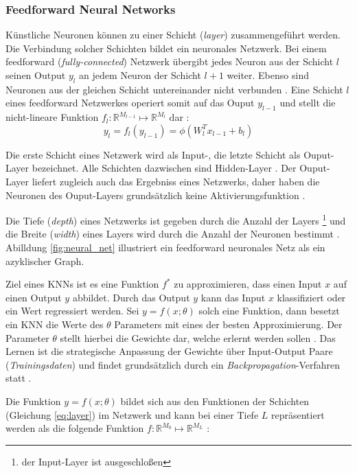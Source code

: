\subsubsection{Feedforward Neural Networks}
\label{sec:feedforwardNN}
Künstliche Neuronen können zu einer Schicht (\textit{layer}) zusammengeführt werden. Die Verbindung solcher Schichten bildet ein neuronales Netzwerk.
Bei einem feedforward (\textit{fully-connected}) Netzwerk übergibt jedes Neuron aus der Schicht $l$ seinen Output $y_{l}$ an jedem Neuron der Schicht $l+1$ weiter. Ebenso sind Neuronen aus der gleichen Schicht untereinander nicht verbunden \cite{Goodfellow-et-al-2016}.
Eine Schicht $l$ eines feedforward Netzwerkes operiert somit auf das Ouput $y_{l-1}$ und stellt die nicht-lineare Funktion $f_l :  \mathbb{R}^{M_{l-1}} \mapsto \mathbb{R}^{M_l}$ dar \cite{bauckhageInformedMachineLearning}:
\begin{equation}
\label{eq:layer}
y_l = f_l(y_{l-1}) = \phi(W^T_lx_{l-1}+b_{l})
\end{equation}


Die erste Schicht eines Netzwerk wird als Input-, die letzte Schicht als Ouput-Layer bezeichnet. Alle Schichten dazwischen sind Hidden-Layer \cite{Goodfellow-et-al-2016}. Der Ouput-Layer liefert zugleich auch das Ergebniss eines Netzwerks, daher haben die Neuronen des Ouput-Layers grundsätzlich keine Aktivierungsfunktion \cite{CS231nConvolutionalNeural}.

Die Tiefe (\textit{depth}) eines Netzwerks ist gegeben durch die Anzahl der Layers \footnote{der Input-Layer ist ausgeschloßen} und die Breite (\textit{width}) eines Layers wird durch die Anzahl der Neuronen bestimmt \cite{Goodfellow-et-al-2016}. 
Abilldung \ref{fig:neural_net} illustriert ein feedforward neuronales Netz als ein azyklischer Graph.

Ziel eines KNNs ist es eine Funktion $f^*$ zu approximieren, dass einen Input $x$ auf einen Output $y$ abbildet. Durch das Output $y$ kann das Input $x$ klassifiziert oder ein Wert regressiert werden. Sei $y = f(x; \theta)$  solch eine Funktion, dann besetzt ein KNN die Werte des $\theta$ Parameters mit eines der besten Approximierung. Der Parameter $\theta$ stellt hierbei die Gewichte dar, welche erlernt werden sollen \cite{Goodfellow-et-al-2016}. 
Das Lernen ist die strategische Anpassung der Gewichte über Input-Output Paare (\textit{Trainingsdaten}) und findet grundsätzlich durch ein \textit{Backpropagation}-Verfahren statt \cite{Goodfellow-et-al-2016}. 

Die Funktion $y = f(x; \theta)$ bildet sich aus den Funktionen der Schichten (Gleichung \ref{eq:layer}) im Netzwerk und kann bei einer Tiefe $L$ repräsentiert werden als die folgende Funktion $f :  \mathbb{R}^{M_0} \mapsto \mathbb{R}^{M_L}$ \cite{Goodfellow-et-al-2016, bauckhageInformedMachineLearning}:
 
